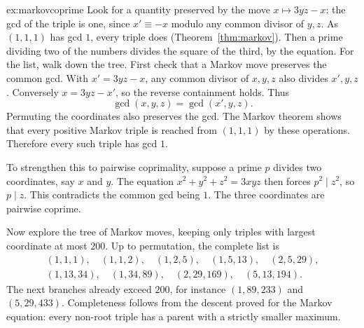 \begin{solution}{ex:markovcoprime}
\idea Look for a quantity preserved by the move $x\mapsto3yz-x$: the gcd of the triple is one, since $x'\equiv-x$ modulo any common divisor of $y,z$. As $(1,1,1)$ has gcd $1$, every triple does (Theorem~\ref{thm:markov}). Then a prime dividing two of the numbers divides the square of the third, by the equation. For the list, walk down the tree.
\writeup First check that a Markov move preserves the common gcd. With $x'=3yz-x$, any common divisor of $x,y,z$ also divides $x',y,z$. Conversely $x=3yz-x'$, so the reverse containment holds. Thus
\[
\gcd(x,y,z)=\gcd(x',y,z).
\]
Permuting the coordinates also preserves the gcd. The Markov theorem shows that every positive Markov triple is reached from $(1,1,1)$ by these operations. Therefore every such triple has gcd $1$.

To strengthen this to pairwise coprimality, suppose a prime $p$ divides two coordinates, say $x$ and $y$. The equation
$x^2+y^2+z^2=3xyz$ then forces $p^2\mid z^2$, so $p\mid z$. This contradicts the common gcd being $1$. The three coordinates are pairwise coprime.

Now explore the tree of Markov moves, keeping only triples with largest coordinate at most $200$. Up to permutation, the complete list is
\[
\begin{gathered}
(1,1,1),\quad(1,1,2),\quad(1,2,5),\quad
(1,5,13),\quad(2,5,29),\\
(1,13,34),\quad(1,34,89),\quad
(2,29,169),\quad(5,13,194).
\end{gathered}
\]
The next branches already exceed $200$, for instance $(1,89,233)$ and $(5,29,433)$. Completeness follows from the descent proved for the Markov equation: every non-root triple has a parent with a strictly smaller maximum.
\end{solution}

